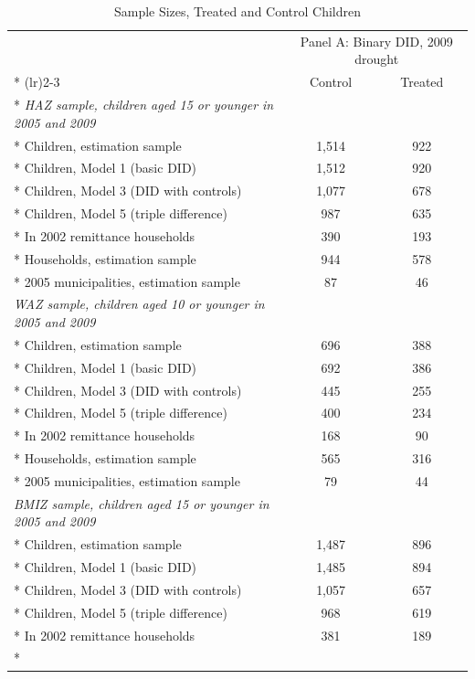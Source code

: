 \documentclass[12pt]{article}
\begin{document}
\begingroup
\footnotesize
\renewcommand{\arraystretch}{0.86}
\setlength{\tabcolsep}{4pt}
\setlength{\LTcapwidth}{\textwidth}
\setlength{\LTleft}{0pt}
\setlength{\LTright}{0pt plus 1fil}
\begin{longtable}{@{\extracolsep{\fill}}lcc}
\caption{Sample Sizes, Treated and Control Children}\\
\toprule
 & \multicolumn{2}{c}{Panel A: Binary DID, 2009 drought}\\*
\cmidrule(lr){2-3}
 & Control & Treated\\*
\midrule
\textit{HAZ sample, children aged 15 or younger in 2005 and 2009} & & \\*
Children, estimation sample & 1,514 & 922\\*
Children, Model 1 (basic DID) & 1,512 & 920\\*
Children, Model 3 (DID with controls) & 1,077 & 678\\*
Children, Model 5 (triple difference) & 987 & 635\\*
\quad In 2002 remittance households & 390 & 193\\*
Households, estimation sample & 944 & 578\\*
2005 municipalities, estimation sample & 87 & 46\\
\addlinespace[6pt]\textit{WAZ sample, children aged 10 or younger in 2005 and 2009} & & \\*
Children, estimation sample & 696 & 388\\*
Children, Model 1 (basic DID) & 692 & 386\\*
Children, Model 3 (DID with controls) & 445 & 255\\*
Children, Model 5 (triple difference) & 400 & 234\\*
\quad In 2002 remittance households & 168 & 90\\*
Households, estimation sample & 565 & 316\\*
2005 municipalities, estimation sample & 79 & 44\\
\addlinespace[6pt]\textit{BMIZ sample, children aged 15 or younger in 2005 and 2009} & & \\*
Children, estimation sample & 1,487 & 896\\*
Children, Model 1 (basic DID) & 1,485 & 894\\*
Children, Model 3 (DID with controls) & 1,057 & 657\\*
Children, Model 5 (triple difference) & 968 & 619\\*
\quad In 2002 remittance households & 381 & 189\\*

\end{longtable}
\end{document}
